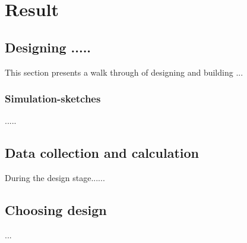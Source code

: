 \chapter{Result}

\section{Designing .....}

This section presents a walk through of designing and building ...

\subsection{Simulation-sketches}
.....

\section{Data collection and calculation}
During the design stage...... 

\section{Choosing design}
...




